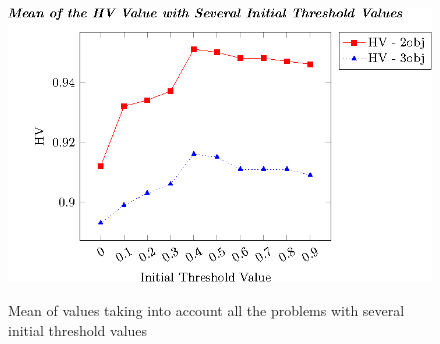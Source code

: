 \begin{figure}[t]
\centering
\includegraphics[scale=0.85]{Images/Graphic-Initial-Distance_tikz-figure0.eps} \\
\caption{Mean of \HV{} values taking into account all the problems with several initial threshold values}\label{fig:Initial-distance-factor}
\end{figure}


